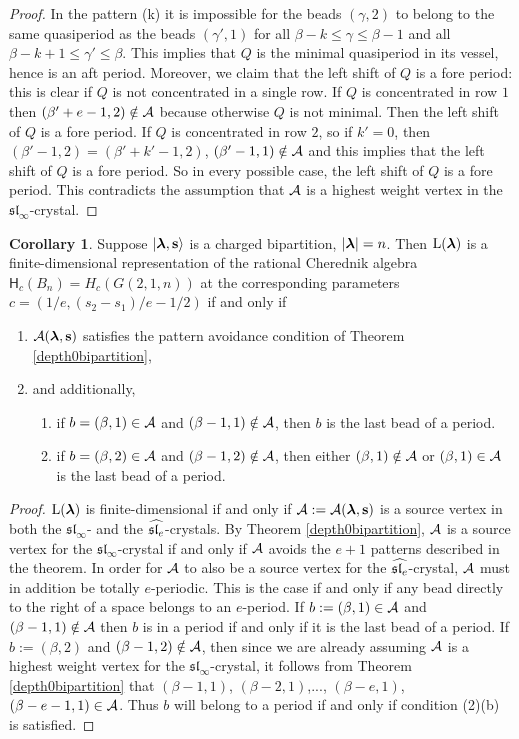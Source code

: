 \documentclass[12pt]{amsart}
\numberwithin{equation}{section}
\theoremstyle{definition}
\newtheorem{corollary}[equation]{Corollary}
\newcommand{\el}{\mathrm{L}}
\newcommand{\slinf}{\mathfrak{sl}_\infty}
\newcommand{\mbs}{\mathbf{s}}
\begin{document}
\begin{proof}
In the pattern (k) it is impossible for the beads $(\gamma,2)$ to belong to the same quasiperiod as the beads $(\gamma',1)$ for all $\beta-k\leq \gamma\leq \beta-1$ and all $\beta-k+1\leq \gamma'\leq \beta$. This implies that $Q$ is the minimal quasiperiod in its vessel, hence is an aft period. Moreover, we claim that the left shift of $Q$ is a fore period: this is clear if $Q$ is not concentrated in a single row. If $Q$ is concentrated in row $1$ then $(\beta'+e-1,2)\notin\mathcal{A}$ because otherwise $Q$ is not minimal. Then the left shift of $Q$ is a fore period. 
 If $Q$ is concentrated in row $2$, so if $k'=0$, then $(\beta'-1,2)=(\beta'+k'-1,2)$, $(\beta'-1,1)\notin\mathcal{A}$ and this implies that the left shift of $Q$ is a fore period. So in every possible case, the left shift of $Q$ is a fore period. This contradicts the assumption that $\mathcal{A}$ is a highest weight vertex in the $\slinf$-crystal. 
\end{proof}

\begin{corollary}\label{2fd}
Suppose $|\bla,\mbs\rangle$ is a charged bipartition, $|\boldsymbol{\lambda}|=n$. Then $\el(\bla)$ is a finite-dimensional representation of the rational Cherednik algebra $\mathsf{H}_c(B_n)=H_c(G(2,1,n))$ at the corresponding parameters $c=(1/e,(s_2-s_1)/e-1/2)$ if and only if 
\begin{enumerate}
\item $\cA(\bla,\mbs)$ satisfies the pattern avoidance condition of Theorem \ref{depth0bipartition}, 
\item and additionally, 
\begin{enumerate}
\item if $b=(\beta,1)\in\mathcal{A}$ and $(\beta-1,1)\notin\mathcal{A}$, then $b$ is the last bead of a period.
\item if $b=(\beta,2)\in\mathcal{A}$ and $(\beta-1,2)\notin\mathcal{A}$, then either $(\beta,1)\notin\mathcal{A}$ or $(\beta,1)\in\mathcal{A}$ is the last bead of a period.
\end{enumerate}
\end{enumerate}
\end{corollary}
\begin{proof} $\el(\bla)$ is finite-dimensional if and only if $\cA:=\cA(\bla,\mbs)$ is a source vertex in both the $\slinf$- and the $\widehat{\mathfrak{sl}_e}$-crystals. By Theorem \ref{depth0bipartition}, $\mathcal{A}$ is a source vertex for the $\slinf$-crystal if and only if $\mathcal{A}$ avoids the $e+1$ patterns described in the theorem. In order for $\mathcal{A}$ to also be a source vertex for the $\widehat{\mathfrak{sl}_e}$-crystal, $\mathcal{A}$ must in addition be totally $e$-periodic. This is the case if and only if any bead directly to the right of a space belongs to an $e$-period. If $b:=(\beta,1)\in\mathcal{A}$ and $(\beta-1,1)\notin\mathcal{A}$ 
 then $b$ is in a period if and only if it is the last bead of a period. If $b:=(\beta,2)$ and $(\beta-1,2)\notin\mathcal{A}$, 
then since we are already assuming $\mathcal{A}$ is a highest weight vertex for the $\slinf$-crystal, it follows from Theorem \ref{depth0bipartition} that $(\beta-1,1)$, $(\beta-2,1)$,..., $(\beta-e,1)$,$(\beta-e-1,1)\in\mathcal{A}$. 
Thus $b$ will belong to a period if and only if condition (2)(b) is satisfied.
\end{proof}
\end{document}
